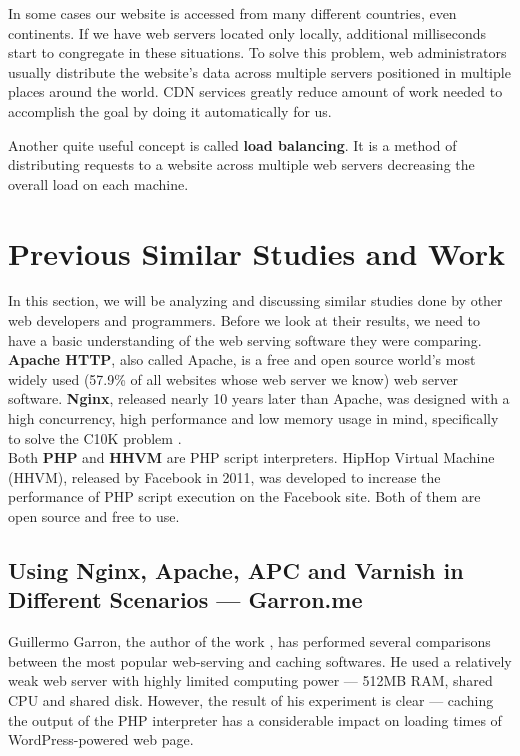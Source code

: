 In some cases our website is accessed from many different countries, even continents. If we have web servers located only locally, additional milliseconds start to congregate in these situations. To solve this problem, web administrators usually distribute the website’s data across multiple servers positioned in multiple places around the world. CDN services greatly reduce amount of work needed to accomplish the goal by doing it automatically for us.

Another quite useful concept is called \textbf{load balancing}. It is a method of distributing requests to a website across multiple web servers decreasing the overall load on each machine.

\section{Previous Similar Studies and Work}

In this section, we will be analyzing and discussing similar studies done by other web developers and programmers. Before we look at their results, we need to have a basic understanding of the web serving software they were comparing. \\

\textbf{Apache HTTP}, also called Apache, is a free and open source world's most widely used (57.9\%\cite{Apache:Usage} of all websites whose web server we know) web server software. \textbf{Nginx}, released nearly 10 years later than Apache, was designed with a high concurrency, high performance and low memory usage in mind, specifically to solve the C10K problem \cite{Nginx:c10k}. \\

Both \textbf{PHP} and \textbf{HHVM} are PHP script interpreters. HipHop Virtual Machine (HHVM), released by Facebook in 2011, was developed to increase the performance of PHP script execution on the Facebook site. Both of them are open source and free to use.

\subsection{Using Nginx, Apache, APC and Varnish in Different Scenarios — Garron.me}

Guillermo Garron, the author of the work \cite{Study:Perf-Garron}, has performed several comparisons between the most popular web-serving and caching softwares. He used a relatively weak web server with highly limited computing power — 512MB RAM, shared CPU and shared disk. However, the result of his experiment is clear — caching the output of the PHP interpreter has a considerable impact on loading times of WordPress-powered web page. \\

